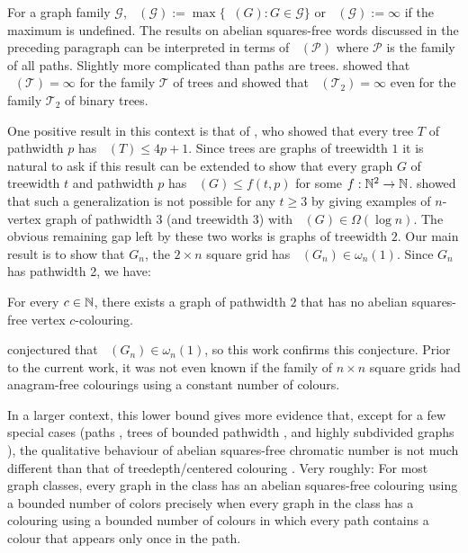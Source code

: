 \documentclass{patmorin}
\DeclareMathOperator{\afcn}{\dot{\chi}_\pi}
\begin{document}
For a graph family $\mathcal{G}$, $\afcn(\mathcal{G}):=\max\{\afcn(G):G\in\mathcal{G}\}$ or $\afcn(\mathcal{G}):=\infty$ if the maximum is undefined. The results on abelian squares-free words discussed in the preceding paragraph can be interpreted in terms of $\afcn(\mathcal{P})$ where $\mathcal{P}$ is the family of all paths.  Slightly more complicated than paths are trees.  \citet{wilson.wood:anagram-free} showed that $\afcn(\mathcal{T})=\infty$ for the family $\mathcal{T}$ of trees and \citet{kamcev.luczak.ea:anagram-free} showed that $\afcn(\mathcal{T_2})=\infty$ even for the family $\mathcal{T}_2$ of binary trees.

One positive result in this context is that of
\citet{wilson.wood:anagram-free}, who showed that every tree $T$ of pathwidth $p$ has $\afcn(T)\le 4p+1$. Since trees are graphs of treewidth $1$ it is natural to ask if this result can be extended to show that every graph $G$ of treewidth $t$ and pathwidth $p$ has $\afcn(G)\le f(t,p)$ for some $f:\mathbb{N}^2\to\mathbb{N}$.  \citet{carmi.dujmovic.ea:anagram-free} showed that such a generalization is not possible for any $t\ge 3$ by giving examples of $n$-vertex graph of pathwidth $3$ (and treewidth $3$) with $\afcn(G)\in\Omega(\log n)$.  The obvious remaining gap left by these two works is graphs of treewidth $2$. Our main result is to show that $G_n$, the $2\times n$ square grid has $\afcn(G_n)\in\omega_n(1)$. Since $G_n$ has pathwidth 2, we have:

\begin{thm}\label{main_vertex}
    For every $c\in\mathbb{N}$, there exists a graph of pathwidth $2$ that has no abelian squares-free vertex $c$-colouring.
\end{thm}

\citet[Section 7.1]{wilson:anagram-free} conjectured that $\afcn(G_n)\in\omega_n(1)$, so this work confirms this conjecture.  Prior to the current work, it was not even known if the family of $n\times n$ square grids had anagram-free colourings using a constant number of colours.

In a larger context, this lower bound gives more evidence that, except for a few special cases (paths \cite{evdokimov:strongly,pleasants:non-repetitive,keranen:abelian}, trees of bounded pathwidth \cite{wilson.wood:anagram-free}, and highly subdivided graphs \cite{wilson.wood:anagram-free2}), the qualitative behaviour of abelian squares-free chromatic number is not much different than that of treedepth/centered colouring \cite{nesetril.ossona:tree-depth}.  Very roughly: For most graph classes, every graph in the class has an abelian squares-free colouring using a bounded number of colors precisely when every graph in the class has a colouring using a bounded number of colours in which every path contains a colour that appears only once in the path.
\end{document}
